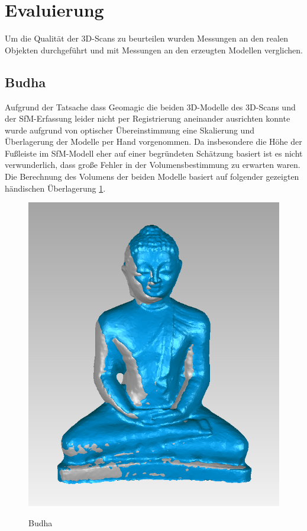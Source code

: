 \documentclass[]{article}
\begin{document}
\section{Evaluierung}
Um die Qualität der 3D-Scans zu beurteilen wurden Messungen an den realen Objekten durchgeführt und mit Messungen an den erzeugten Modellen verglichen.

\subsection{Budha}

Aufgrund der Tatsache dass Geomagic die beiden 3D-Modelle des 3D-Scans und der SfM-Erfassung leider nicht per Registrierung aneinander ausrichten konnte wurde aufgrund von optischer Übereinstimmung eine Skalierung und Überlagerung der Modelle per Hand vorgenommen. Da insbesondere die Höhe der Fußleiste im SfM-Modell eher auf einer begründeten Schätzung basiert ist es nicht verwunderlich, dass große Fehler in der Volumensbestimmung zu erwarten waren. Die Berechnung des Volumens der beiden Modelle basiert auf folgender gezeigten händischen Überlagerung \ref{fig:budhaMerge}.

\begin{figure}[H]
\caption{Budha}
\centering
\includegraphics[scale=0.4]{images/GeoMagicBudhaPictures/Budha_Merge_SfM_3DScan.PNG}
\label{fig:budhaMerge}
\end{figure}
\end{document}
